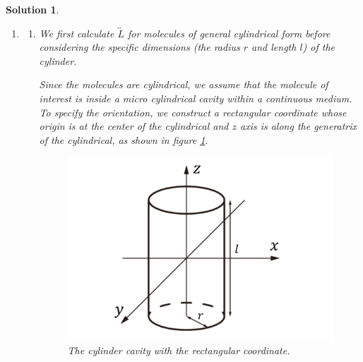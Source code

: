 \documentclass[UTF8,10pt,a4paper]{article}
\theoremstyle{Problem}
\theoremstyle{Solution}
\newtheorem*{sol}{Solution}
\begin{document}
\begin{sol}
    \begin{enumerate}
        \item[(a)]
        \begin{enumerate}
            \item[(i.)] We first calculate $\overleftrightarrow{L}$ for molecules of general cylindrical form before considering the specific dimensions (the radius $r$ and length $l$) of the cylinder.

            Since the molecules are cylindrical, we assume that the molecule of interest is inside a micro cylindrical cavity within a continuous medium. To specify the orientation, we construct a rectangular coordinate whose origin is at the center of the cylindrical and $z$ axis is along the generatrix of the cylindrical, as shown in figure \ref{sketch}.\\
            \begin{figure}[h]
                \centering
                \includegraphics[width=.4\textwidth]{sketch.pdf}
                \caption{The cylinder cavity with the rectangular coordinate.}
                \label{sketch}
            \end{figure}


\end{enumerate}
\end{enumerate}
\end{sol}
\end{document}
